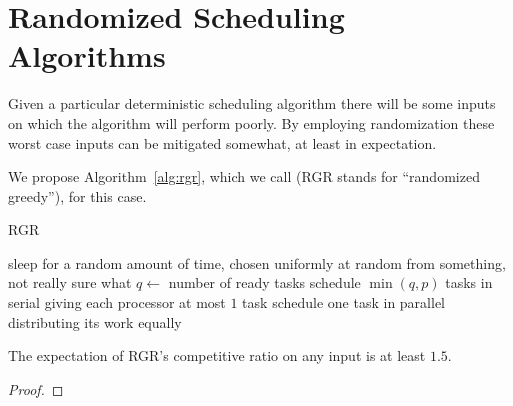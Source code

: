 \section{Randomized Scheduling Algorithms}
Given a particular deterministic scheduling algorithm there will
be some inputs on which the algorithm will perform poorly. 
By employing randomization these worst case inputs can be
mitigated somewhat, at least in expectation.

We propose Algorithm~\ref{alg:rgr}, which we call
 (RGR stands for \enquote{randomized greedy}), for this case.

\begin{algorithm}
  \caption{RGR}
  \label{alg:rgr}
  \begin{algorithmic}
        \State sleep for a random amount of time, chosen
        uniformly at random from something, not really sure what 
        \State $q \gets $ number of ready tasks
          \State schedule $\min(q, p)$ tasks in serial
          \State giving each processor at most $1$ task
        \Else
          \State schedule one task in parallel
          \State distributing its work equally 
        \EndIf
      \EndIf
    \EndWhile
  \end{algorithmic}
\end{algorithm}

\begin{proposition}
  The expectation of RGR's competitive ratio on any input
  is at least $1.5$.
\end{proposition}
\begin{proof}
\end{proof}
